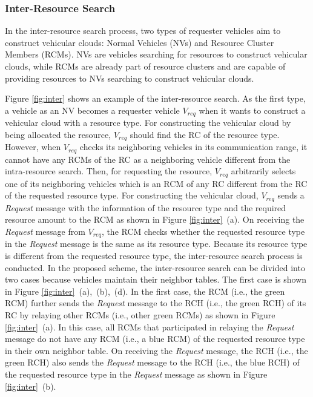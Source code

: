 \documentclass[sensors,article,accept,moreauthors,pdftex]{Definitions/mdpi}
\begin{document}
\subsubsection{Inter-Resource Search}



In the inter-resource search process, two types of requester vehicles aim to construct vehicular clouds: Normal Vehicles (NVs) and Resource Cluster Members (RCMs). NVs are vehicles searching for resources to construct vehicular clouds, while RCMs are already part of resource clusters and are capable of providing resources to NVs searching to construct vehicular clouds.

Figure \ref{fig:inter} shows an example of the inter-resource search.
As the first type, a vehicle as an NV becomes a requester vehicle $V_{req}$ when it wants to construct a vehicular cloud with a resource type.
For constructing the vehicular cloud by being allocated the resource, $V_{req}$ should find the RC of the resource type.
However, when $V_{req}$ checks its neighboring vehicles in its communication range, it cannot have any RCMs of the RC as a neighboring vehicle different from the intra-resource search.
Then, for requesting the resource, $V_{req}$ arbitrarily selects one of its neighboring vehicles which is an RCM of any RC different from the RC of the requested resource type.
For constructing the vehicular cloud, $V_{req}$ sends a \textit{Request} message with the information of the resource type and the required resource amount to the RCM as shown in Figure \ref{fig:inter}~(a).
On receiving the \textit{Request} message from $V_{req}$, the RCM checks whether the requested resource type in the \textit{Request} message is the same as its resource type.
Because its resource type is different from the requested resource type, the inter-resource search process is conducted. 
In the proposed scheme, the inter-resource search can be divided into two cases because vehicles maintain their neighbor tables. 
The first case is shown in \linebreak  Figure \ref{fig:inter}~(a),~(b),~(d). 
In the first case, the RCM (i.e., the green RCM) further sends the \textit{Request} message to the RCH (i.e., the green RCH) of its RC by relaying other RCMs (i.e., other green RCMs) as shown in Figure \ref{fig:inter}~(a).
In this case, all RCMs that participated in relaying the \textit{Request} message do not have any RCM (i.e., a blue RCM) of the requested resource type in their own neighbor table. 
On receiving the \textit{Request} message, the RCH (i.e., the green RCH) also sends the \textit{Request} message to the RCH (i.e., the blue RCH) of the requested resource type in the \textit{Request} message as shown in Figure \ref{fig:inter}~(b).
\end{document}
